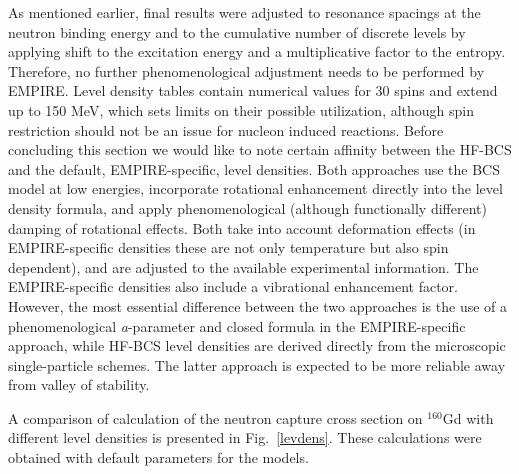 \documentclass[twocolumn,amsmath,amssymb,10pt,groupedaddress,a4paper]{revtex4}
\begin{document}
 As mentioned earlier, final results were
adjusted to resonance spacings at the neutron binding energy and to
the cumulative number of discrete levels by applying shift to the
excitation energy and a multiplicative factor to the entropy. Therefore,
no further phenomenological adjustment needs to be performed by EMPIRE.
Level density tables contain numerical values for 30 spins and extend
up to 150 MeV, which sets limits on their possible utilization, although
spin restriction should not be an issue for nucleon induced reactions.
Before concluding this section we would like to note certain affinity
between the HF-BCS and the default, EMPIRE-specific,
level densities. Both approaches use the BCS
model at low energies, incorporate rotational enhancement directly
into the level density formula, and apply phenomenological (although
functionally different) damping of rotational effects. Both take into
account deformation effects (in EMPIRE-specific densities these are
not only temperature but also spin dependent), and are adjusted to
the available experimental information. The EMPIRE-specific densities
also include a vibrational enhancement factor. However, the most essential
difference between the two approaches is the use of a phenomenological
\emph{a}-parameter and closed formula in the EMPIRE-specific approach,
while HF-BCS level densities
are derived directly from the microscopic single-particle schemes.
The latter approach is expected to be more reliable away from valley
of stability.

A comparison of  calculation of the neutron capture cross section on $^{160}$Gd
with different level densities is presented in Fig.~\ref{levdens}. These
calculations were obtained with default parameters for the models.
\end{document}
